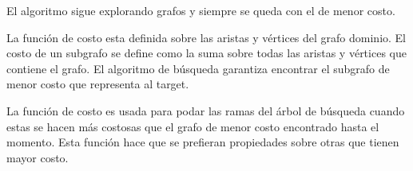 El algoritmo sigue explorando grafos y siempre se queda con el de menor costo.

La funci\'on de costo esta definida sobre las aristas y v\'ertices del grafo dominio. El costo de un subgrafo se define como la suma sobre todas las aristas y v\'ertices que contiene el grafo.
El algoritmo de b\'usqueda garantiza encontrar el subgrafo de menor costo que representa al target.

La funci\'on de costo es usada para podar las ramas del \'arbol de b\'usqueda cuando estas se hacen m\'as costosas que el grafo de menor costo encontrado hasta el momento. Esta funci\'on hace que se prefieran propiedades sobre otras que tienen mayor costo.

%
%
%


